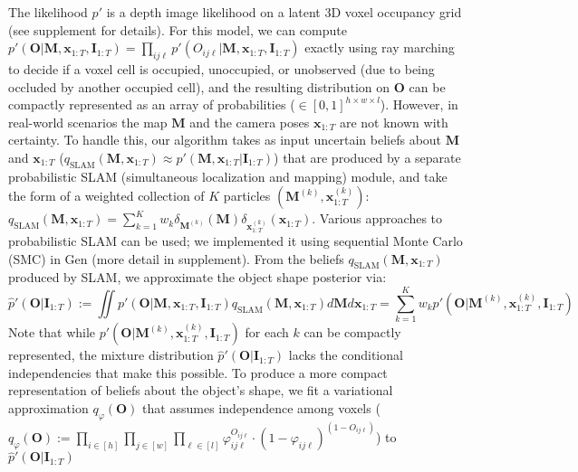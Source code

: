 The likelihood $p'$ is a 
depth image likelihood on a latent 3D voxel occupancy grid (see supplement for details).
For this model, we can compute $p'(\mathbf{O} | \mathbf{M}, \mathbf{x}_{1:T}, \mathbf{I}_{1:T})
= \prod_{ij\ell} p'(O_{ij\ell} | \mathbf{M}, \mathbf{x}_{1:T}, \mathbf{I}_{1:T})
$ exactly using ray marching to decide if a voxel cell is occupied, unoccupied, or unobserved (due to being occluded by another occupied cell), and the resulting distribution on $\mathbf{O}$
can be compactly represented as an array of probabilities ($\in [0, 1]^{h \times w \times l}$).
However, in real-world scenarios the map $\mathbf{M}$ and the camera poses $\mathbf{x}_{1:T}$ are not known with certainty.
To handle this, our algorithm takes as input uncertain beliefs
about $\mathbf{M}$ and $\mathbf{x}_{1:T}$
($q_{\mathrm{SLAM}}(\mathbf{M}, \mathbf{x}_{1:T}) \approx p'(\mathbf{M}, \mathbf{x}_{1:T} | \mathbf{I}_{1:T})$)
that are produced by
a separate probabilistic SLAM (simultaneous localization and mapping) module,
and take the form of a weighted collection of $K$ particles $(\mathbf{M}^{(k)}, \mathbf{x}_{1:T}^{(k)})$: $q_{\mathrm{SLAM}}(\mathbf{M}, \mathbf{x}_{1:T}) = \sum_{k=1}^K w_k \delta_{\mathbf{M}^{(k)}}(\mathbf{M}) \delta_{\mathbf{x}_{1:T}^{(k)}}(\mathbf{x}_{1:T})$.
Various approaches to probabilistic SLAM can be used; we implemented it
using sequential Monte Carlo (SMC) in Gen (more detail in supplement).
From the beliefs $q_{\mathrm{SLAM}}(\mathbf{M}, \mathbf{x}_{1:T})$ produced by SLAM, we approximate the object shape posterior via:
\[
\hat{p}'(\mathbf{O} | \mathbf{I}_{1:T})
:= \iint p'(\mathbf{O} | \mathbf{M}, \mathbf{x}_{1:T}, \mathbf{I}_{1:T}) q_{\mathrm{SLAM}}(\mathbf{M}, \mathbf{x}_{1:T}) d\mathbf{M} d\mathbf{x}_{1:T}
= \sum_{k=1}^K w_k p'(\mathbf{O} | \mathbf{M}^{(k)}, \mathbf{x}_{1:T}^{(k)}, \mathbf{I}_{1:T})
\]
Note that while $p'(\mathbf{O} | \mathbf{M}^{(k)}, \mathbf{x}_{1:T}^{(k)}, \mathbf{I}_{1:T})$ for each $k$
can be compactly represented,
the mixture distribution $\hat{p}'(\mathbf{O} | \mathbf{I}_{1:T})$ lacks the conditional independencies that make this possible.
To produce a more compact representation of beliefs about the object's shape,
we fit a variational approximation $q_{\varphi}(\mathbf{O})$
that assumes independence among voxels 
($q_{\varphi}(\mathbf{O}) := \prod_{i\in[h]} \prod_{j\in[w]} \prod_{\ell\in[l]} \varphi_{ij\ell}^{O_{ij\ell}} \cdot (1 - \varphi_{ij\ell})^{(1-O_{ij\ell})}$) to $\hat{p}'(\mathbf{O} | \mathbf{I}_{1:T})$
